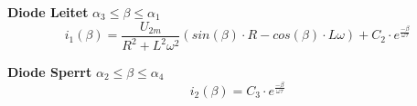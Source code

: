 \textbf{Diode Leitet} $ \alpha_3 \leq \beta \leq \alpha_1 $\newline
\[ i_{1}(\beta) = \frac{U_{2m}}{R^2 + L^2\omega^2}\left(sin(\beta) \cdot R - cos(\beta) \cdot L\omega\right) + C_2 \cdot e^{\frac{-\beta}{\omega \tau}} \]

\textbf{Diode Sperrt} $ \alpha_2 \leq \beta \leq \alpha_4 $\newline
\[ i_2(\beta) =  C_3 \cdot e^{\frac{-\beta}{\omega \tau}} \]

\clearpage







